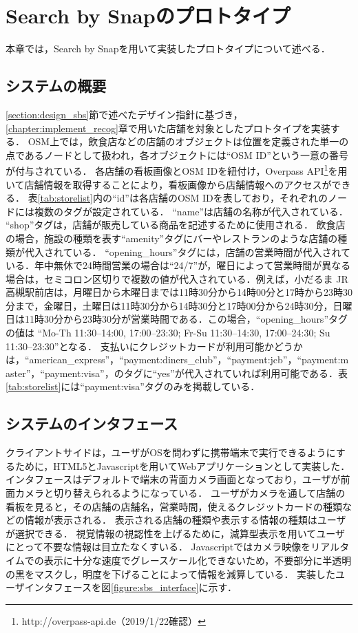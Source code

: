 \chapter{Search by Snapのプロトタイプ}
本章では，Search by Snapを用いて実装したプロトタイプについて述べる．

\section{システムの概要}
  \ref{section:design_sbs}節で述べたデザイン指針に基づき，\ref{chapter:implement_recog}章で用いた店舗を対象としたプロトタイプを実装する．
  OSM上では，飲食店などの店舗のオブジェクトは位置を定義された単一の点であるノードとして扱われ，各オブジェクトには``OSM ID''という一意の番号が付与されている．
  各店舗の看板画像とOSM IDを紐付け，Overpass API\footnote{http://overpass-api.de（2019/1/22確認）}を用いて店舗情報を取得することにより，看板画像から店舗情報へのアクセスができる．
  表\ref{tab:storelist}内の``id''は各店舗のOSM IDを表しており，それぞれのノードには複数のタグが設定されている．
  ``name''は店舗の名称が代入されている．
  ``shop''タグは，店舗が販売している商品を記述するために使用される．
  飲食店の場合，施設の種類を表す``amenity''タグにバーやレストランのような店舗の種類が代入されている．
  ``opening\_hours''タグには，店舗の営業時間が代入されている．年中無休で24時間営業の場合は``24/7''が，曜日によって営業時間が異なる場合は，セミコロン区切りで複数の値が代入されている．例えば，小だるま JR高槻駅前店は，月曜日から木曜日までは11時30分から14時00分と17時から23時30分まで，金曜日，土曜日は11時30分から14時30分と17時00分から24時30分，日曜日は11時30分から23時30分が営業時間である．この場合，``opening\_hours''タグの値は
  ``Mo-Th 11:30--14:00, 17:00--23:30; Fr-Su 11:30--14:30, 17:00--24:30; Su 11:30--23:30''となる．
  支払いにクレジットカードが利用可能かどうかは，``american\_express''，``payment:diners\_club''，``payment:jcb''，``payment:master''，``payment:visa''，のタグに``yes''が代入されていれば利用可能である．表\ref{tab:storelist}には``payment:visa''タグのみを掲載している．


\section{システムのインタフェース}
  クライアントサイドは，ユーザがOSを問わずに携帯端末で実行できるようにするために，HTML5とJavascriptを用いてWebアプリケーションとして実装した．
  インタフェースはデフォルトで端末の背面カメラ画面となっており，ユーザが前面カメラと切り替えられるようになっている．
  ユーザがカメラを通して店舗の看板を見ると，その店舗の店舗名，営業時間，使えるクレジットカードの種類などの情報が表示される．
  表示される店舗の種類や表示する情報の種類はユーザが選択できる．
  視覚情報の視認性を上げるために，減算型表示を用いてユーザにとって不要な情報は目立たなくすいる．
  Javascriptではカメラ映像をリアルタイムでの表示に十分な速度でグレースケール化できないため，不要部分に半透明の黒をマスクし，明度を下げることによって情報を減算している．
  実装したユーザインタフェースを図\ref{figure:sbs_interface}に示す．

